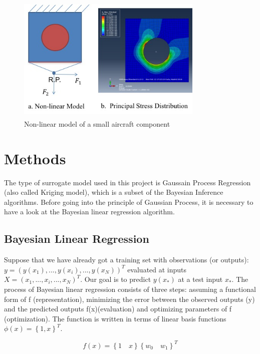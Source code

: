 \documentclass[conference]{IEEEtran}
\newlength\figureheight
\newlength\figurewidth
\begin{document}
%   
\begin{figure} 
\centering
\includegraphics[width=3.5in,height=2.4in]{model1.jpg}
\caption{Non-linear model of a small aircraft component}
\label{fig:graph}
\end{figure}

\section{Methods}
The type of surrogate model used in this project is Gaussain Process Regression (also called Kriging model), which is a subset of the Bayesian Inference algorithms. Before going into the principle of Gaussian Process, it is necessary to have a look at the Bayesian linear regression algorithm\cite{neal2012bayesian}. 
\subsection{Bayesian Linear Regression}
Suppose that we have already got a training set with observations (or outputs):
$y=(y(x_1),...,y(x_i),...,y(x_N))^T$ 
evaluated at inputs $X=(x_1,...,x_i,...,x_N)^T$. Our goal is to predict $y(x_*)$ at a test input $x_*$.
The process of Bayesian linear regression consists of three steps: assuming a functional form of f (representation), minimizing the error between the observed outputs (y) and the predicted outputs f(x)(evaluation) and optimizing parameters of f (optimization). The function is written in terms of linear basis functions $\phi(x)=\left\{ 1,x \right\}^T$. 

\begin{equation}
  f(x)=\left\{ 1\quad x \right\} \left\{ w_0 \quad w_1 \right\}^T
\end{equation}
\end{document}
